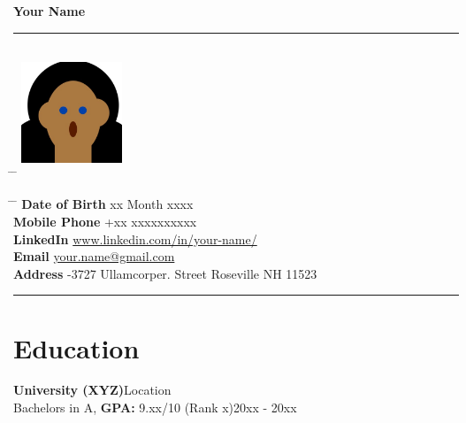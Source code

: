 \documentclass[10pt]{article}
\begin{document}
{\centering
\color{battleshipgrey}
{\bf\huge Your Name}\\
\rule{19cm}{0.5pt}}

\parbox{\textwidth}{ 
	\begin{tabbing}
		\hspace{3cm} \= \hspace{4cm} \= \kill 
		\includegraphics[width=3cm, height=4cm, keepaspectratio]{passport_photo.jpg}
	\end{tabbing}
}
\indent %
\parbox{\textwidth}{ 
	\begin{tabbing} 
		\hspace{3cm} \= \hspace{4cm} \= \kill 
		{\bf Date of Birth} \> xx Month xxxx \\
		{\bf Mobile Phone} \> +xx xxxxxxxxxx \\
		{\bf LinkedIn} \> \href{https://www.linkedin.com/}{www.linkedin.com/in/your-name/} \\ 
		{\bf Email} \> \href{mailto:your.name@gmail.com}{your.name@gmail.com} \\ 
		{\bf Address} -3727 Ullamcorper. Street Roseville NH 11523
	\end{tabbing}
}


{\centering
\color{battleshipgrey}
\rule{19cm}{0.5pt}}

\section{Education}
	{\bf University (XYZ)}\hfill Location\\
	Bachelors in A, {\bf GPA:} 9.xx/10 (Rank x)\hfill 20xx - 20xx 

\end{document}
